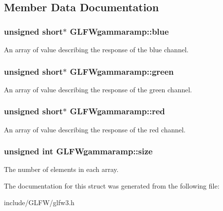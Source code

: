 \subsection{\-Member \-Data \-Documentation}
\hypertarget{structGLFWgammaramp_acf0c836d0efe29c392fe8d1a1042744b}{
\subsubsection[{blue}]{\setlength{\rightskip}{0pt plus 5cm}unsigned short$\ast$ {\bf \-G\-L\-F\-Wgammaramp\-::blue}}}\label{structGLFWgammaramp_acf0c836d0efe29c392fe8d1a1042744b}
\-An array of value describing the response of the blue channel. \hypertarget{structGLFWgammaramp_affccc6f5df47820b6562d709da3a5a3a}{
\subsubsection[{green}]{\setlength{\rightskip}{0pt plus 5cm}unsigned short$\ast$ {\bf \-G\-L\-F\-Wgammaramp\-::green}}}\label{structGLFWgammaramp_affccc6f5df47820b6562d709da3a5a3a}
\-An array of value describing the response of the green channel. \hypertarget{structGLFWgammaramp_a2cce5d968734b685623eef913e635138}{
\subsubsection[{red}]{\setlength{\rightskip}{0pt plus 5cm}unsigned short$\ast$ {\bf \-G\-L\-F\-Wgammaramp\-::red}}}\label{structGLFWgammaramp_a2cce5d968734b685623eef913e635138}
\-An array of value describing the response of the red channel. \hypertarget{structGLFWgammaramp_ad620e1cffbff9a32c51bca46301b59a5}{
\subsubsection[{size}]{\setlength{\rightskip}{0pt plus 5cm}unsigned int {\bf \-G\-L\-F\-Wgammaramp\-::size}}}\label{structGLFWgammaramp_ad620e1cffbff9a32c51bca46301b59a5}
\-The number of elements in each array. 

\-The documentation for this struct was generated from the following file\-:\begin{DoxyCompactItemize}
\item 
include/\-G\-L\-F\-W/glfw3.\-h\end{DoxyCompactItemize}
